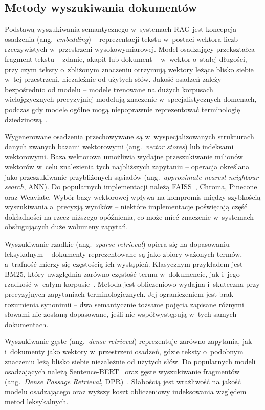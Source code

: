 \subsection{Metody wyszukiwania dokumentów}\label{subsec:metody-wyszukiwania-dokumentow}

Podstawą wyszukiwania semantycznego w~systemach RAG jest koncepcja osadzenia
(ang.~\textit{embedding}) -- reprezentacji tekstu w~postaci wektora liczb
rzeczywistych w~przestrzeni wysokowymiarowej. Model osadzający przekształca
fragment tekstu -- zdanie, akapit lub dokument -- w~wektor o~stałej długości,
przy czym teksty o~zbliżonym znaczeniu otrzymują wektory leżące blisko siebie
w~tej przestrzeni, niezależnie od użytych słów. Jakość osadzeń zależy
bezpośrednio od modelu -- modele trenowane na dużych korpusach wielojęzycznych
precyzyjniej modelują znaczenie w~specjalistycznych domenach, podczas gdy
modele ogólne mogą niepoprawnie reprezentować terminologię
dziedzinową~\cite{reimers2019sentence}.

Wygenerowane osadzenia przechowywane są w~wyspecjalizowanych strukturach danych
zwanych bazami wektorowymi (ang.~\textit{vector stores}) lub indeksami
wektorowymi. Baza wektorowa umożliwia wydajne przeszukiwanie milionów wektorów
w~celu znalezienia tych najbliższych zapytaniu -- operacja określana jako
przeszukiwanie przybliżonych sąsiadów (ang.~\textit{approximate nearest
  neighbour search}, ANN). Do popularnych implementacji należą
FAISS~\cite{johnson2019billion}, Chroma, Pinecone oraz Weaviate. Wybór bazy
wektorowej wpływa na kompromis między szybkością wyszukiwania a~precyzją
wyników -- niektóre implementacje poświęcają część dokładności na rzecz
niższego opóźnienia, co może mieć znaczenie w~systemach obsługujących duże
wolumeny zapytań.

Wyszukiwanie rzadkie (ang.~\textit{sparse retrieval}) opiera się na dopasowaniu
leksykalnym -- dokumenty reprezentowane są jako zbiory ważonych termów,
a~trafność mierzy się częstością ich wystąpień. Klasycznym przykładem jest
BM25, który uwzględnia zarówno częstość termu w~dokumencie, jak i~jego rzadkość
w~całym korpusie~\cite{robertson2009probabilistic}. Metoda jest obliczeniowo
wydajna i~skuteczna przy precyzyjnych zapytaniach terminologicznych. Jej
ograniczeniem jest brak rozumienia synonimii -- dwa semantycznie tożsame
pojęcia zapisane różnymi słowami nie zostaną dopasowane, jeśli nie
współwystępują w~tych samych dokumentach.

Wyszukiwanie gęste (ang.~\textit{dense retrieval}) reprezentuje zarówno
zapytania, jak i~dokumenty jako wektory w~przestrzeni osadzeń, gdzie teksty
o~podobnym znaczeniu leżą blisko siebie niezależnie od użytych słów. Do
popularnych modeli osadzających należą Sentence-BERT~\cite{reimers2019sentence}
oraz gęste wyszukiwanie fragmentów (ang.~\textit{Dense Passage Retrieval},
DPR)~\cite{karpukhin2020dense}. Słabością jest wrażliwość na jakość modelu
osadzającego oraz wyższy koszt obliczeniowy indeksowania względem metod
leksykalnych.

